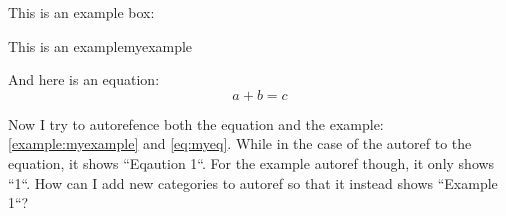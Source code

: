 \documentclass{article}
\begin{document}
This is an example box:
\begin{example}{This is an example}{myexample}
	\blindtext[1]
\end{example}

And here is an equation:
\begin{equation}
	a+b=c
	\label{eq:myeq}
\end{equation}

\vspace{1em}
Now I try to autorefence both the equation and the example: \autoref{example:myexample} and \autoref{eq:myeq}. While in the case of the autoref to the equation, it shows ``Eqaution 1``. For the example autoref though, it only shows ``1``. How can I add new categories to autoref so that it instead shows ``Example 1``?
\end{document}
